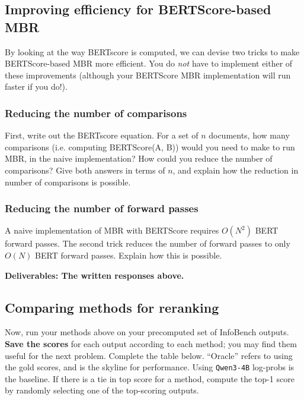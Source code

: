 \documentclass{article}
\begin{document}
\subsection{Improving efficiency for BERTScore-based MBR}
By looking at the way BERTscore is computed, we can devise two tricks to make BERTScore-based MBR more efficient. You do \textit{not} have to implement either of these improvements (although your BERTScore MBR implementation will run faster if you do!). 

\subsubsection{Reducing the number of comparisons}
First, write out the BERTscore equation. For a set of $n$ documents, how many comparisons (i.e. computing BERTScore(A, B)) would you need to make to run MBR, in the naive implementation? How could you reduce the number of comparisons? Give both answers in terms of $n$, and explain how the reduction in number of comparisons is possible. 

\begin{solve}
    
\end{solve}

\subsubsection{Reducing the number of forward passes}
A naive implementation of MBR with BERTScore requires $O(N^2)$ BERT forward passes. The second trick reduces the number of forward passes to only $O(N)$ BERT forward passes. Explain how this is possible.



\begin{solve}
    
\end{solve}
\textbf{Deliverables: The written responses above.}

\subsection{Comparing methods for reranking}
Now, run your methods above on your precomputed set of InfoBench outputs. \textbf{Save the scores} for each output according to each method; you may find them useful for the next problem. Complete the table below. ``Oracle'' refers to using the gold scores, and is the skyline for performance. Using \texttt{Qwen3-4B} log-probs is the baseline. If there is a tie in top score for a method, compute the top-1 score by randomly selecting one of the top-scoring outputs.
\end{document}
